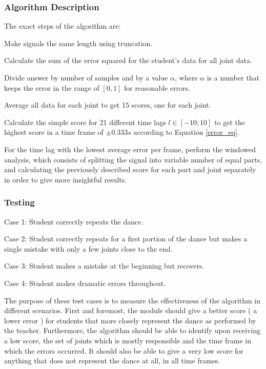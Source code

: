 \documentclass[11pt,a4paper]{article}
\begin{document}
\subsubsection{Algorithm Description}
\noindent
 The exact steps of the algorithm are:
\begin{compactitem}
\setlength{\itemsep}{1pt}
\setlength{\parskip}{0pt}
\setlength{\parsep}{0pt}
	\item Make signals the same length using truncation.
	\item Calculate the sum of the error squared for the student's data for all joint data.
	\item Divide answer by number of samples and by a value $\alpha$, where $\alpha$ is a number that keeps the error in the range of $[0, 1]$ for reasonable errors. 
	\item Average all data for each joint to get 15 scores, one for each joint.
	\item Calculate the simple score for 21 different time lags $l \in [-10;10]$ to get the highest score in a time frame of $\pm 0.333s$
 according to Equation \eqref{error_eq}.
	\item For the time lag with the lowest average error per frame, perform the windowed analysis, which consists of splitting the signal into variable number of equal parts, and calculating the previously described score for each part and joint separately in order to give more insightful results. 
\end{compactitem}
\subsubsection{Testing}
\begin{compactitem}
\item{Case 1: Student correctly repeats the dance.}
\item{Case 2: Student correctly repeats for a first portion of the dance but makes a single mistake with only a few joints close to the end.}
\item{Case 3: Student makes a mistake at the beginning but recovers.}
\item{Case 4: Student makes dramatic errors throughout.}
\end{compactitem}

\noindent
The purpose of these test cases is to measure the effectiveness of the algorithm in different scenarios. First and foremost, the module should give a better score ( a lower error ) for students that more closely represent the dance as performed by the teacher. Furthermore, the algorithm should be able to identify upon receiving a low score,  the set of joints which is mostly responsible and the time frame in which the errors occurred. It should also be able to give a very low score for anything that does not represent the dance at all, in all time frames.
\end{document}
